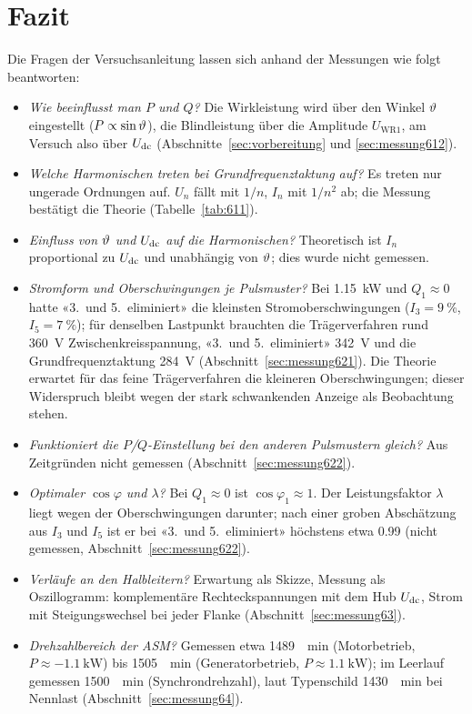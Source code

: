 \section{Fazit}
\label{sec:fazit}

Die Fragen der Versuchsanleitung lassen sich anhand der Messungen wie folgt beantworten:

\begin{itemize}
  \item \emph{Wie beeinflusst man $P$ und $Q$?} Die Wirkleistung wird über den Winkel $\vartheta$ eingestellt ($P\propto\sin\vartheta$), die Blindleistung über die Amplitude $U_{\mathrm{WR1}}$, am Versuch also über $U_{\mathrm{dc}}$ (Abschnitte~\ref{sec:vorbereitung} und \ref{sec:messung612}).
  \item \emph{Welche Harmonischen treten bei Grundfrequenztaktung auf?} Es treten nur ungerade Ordnungen auf. $U_n$ fällt mit $1/n$, $I_n$ mit $1/n^2$ ab; die Messung bestätigt die Theorie (Tabelle~\ref{tab:611}).
  \item \emph{Einfluss von $\vartheta$ und $U_{\mathrm{dc}}$ auf die Harmonischen?} Theoretisch ist $I_n$ proportional zu $U_{\mathrm{dc}}$ und unabhängig von $\vartheta$; dies wurde nicht gemessen.
  \item \emph{Stromform und Oberschwingungen je Pulsmuster?} Bei \SI{1.15}{\kilo\watt} und $Q_1\approx0$ hatte «3.\ und 5.\ eliminiert» die kleinsten Stromoberschwingungen ($I_3=\SI{9}{\percent}$, $I_5=\SI{7}{\percent}$); für denselben Lastpunkt brauchten die Trägerverfahren rund \SI{360}{\volt} Zwischenkreisspannung, «3.\ und 5.\ eliminiert» \SI{342}{\volt} und die Grundfrequenztaktung \SI{284}{\volt} (Abschnitt~\ref{sec:messung621}). Die Theorie erwartet für das feine Trägerverfahren die kleineren Oberschwingungen; dieser Widerspruch bleibt wegen der stark schwankenden Anzeige als Beobachtung stehen.
  \item \emph{Funktioniert die $P$/$Q$-Einstellung bei den anderen Pulsmustern gleich?} Aus Zeitgründen nicht gemessen (Abschnitt~\ref{sec:messung622}).
  \item \emph{Optimaler $\cos\varphi$ und $\lambda$?} Bei $Q_1\approx0$ ist $\cos\varphi_1\approx1$. Der Leistungsfaktor $\lambda$ liegt wegen der Oberschwingungen darunter; nach einer groben Abschätzung aus $I_3$ und $I_5$ ist er bei «3.\ und 5.\ eliminiert» höchstens etwa 0.99 (nicht gemessen, Abschnitt~\ref{sec:messung622}).
  \item \emph{Verläufe an den Halbleitern?} Erwartung als Skizze, Messung als Oszillogramm: komplementäre Rechteckspannungen mit dem Hub $U_{\mathrm{dc}}$, Strom mit Steigungswechsel bei jeder Flanke (Abschnitt~\ref{sec:messung63}).
  \item \emph{Drehzahlbereich der ASM?} Gemessen etwa \SI{1489}{\per\minute} (Motorbetrieb, $P\approx\SI{-1.1}{\kilo\watt}$) bis \SI{1505}{\per\minute} (Generatorbetrieb, $P\approx\SI{1.1}{\kilo\watt}$); im Leerlauf gemessen \SI{1500}{\per\minute} (Synchrondrehzahl), laut Typenschild \SI{1430}{\per\minute} bei Nennlast (Abschnitt~\ref{sec:messung64}).
\end{itemize}
